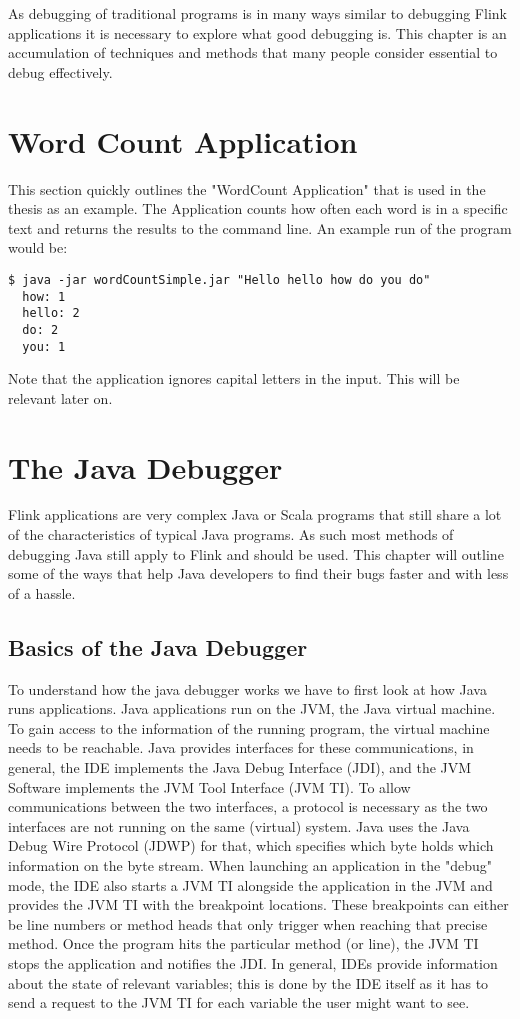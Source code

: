 As debugging of traditional programs is in many ways similar to debugging Flink applications it is necessary to explore what good debugging is. This chapter is an accumulation of techniques and methods that many people consider essential to debug effectively.

\section{Word Count Application}
\label{wordCountApplication}
This section quickly outlines the "WordCount Application" that is used in the thesis as an example. The Application counts how often each word is in a specific text and returns the results to the command line. An example run of the program would be:

\begin{lstlisting}[caption={WordCount Result}]
  $ java -jar wordCountSimple.jar "Hello hello how do you do"
  how: 1
  hello: 2
  do: 2
  you: 1
\end{lstlisting}

Note that the application ignores capital letters in the input. This will be relevant later on.
\section{The Java Debugger}

Flink applications are very complex Java or Scala programs that still share a lot of the characteristics of typical Java programs. As such most methods of debugging Java still apply to Flink and should be used. This chapter will outline some of the ways that help Java developers to find their bugs faster and with less of a hassle.

\subsection{Basics of the Java Debugger}

To understand how the java debugger works we have to first look at how Java runs applications. Java applications run on the JVM, the Java virtual machine. To gain access to the information of the running program, the virtual machine needs to be reachable. Java provides interfaces for these communications, in general, the IDE implements the Java Debug Interface (JDI), and the JVM Software implements the JVM Tool Interface (JVM TI). To allow communications between the two interfaces, a protocol is necessary as the two interfaces are not running on the same (virtual) system. Java uses the Java Debug Wire Protocol (JDWP) for that, which specifies which byte holds which information on the byte stream. When launching an application in the "debug" mode, the IDE also starts a JVM TI alongside the application in the JVM and provides the JVM TI with the breakpoint locations. These breakpoints can either be line numbers or method heads that only trigger when reaching that precise method. Once the program hits the particular method (or line), the JVM TI stops the application and notifies the JDI. In general, IDEs provide information about the state of relevant variables; this is done by the IDE itself as it has to send a request to the JVM TI for each variable the user might want to see.

